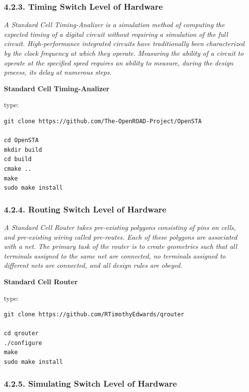 \documentclass[]{article}
\begin{document}
\subsubsection{4.2.3. Timing Switch Level of
Hardware}\label{timing-switch-level-of-hardware}

\emph{A Standard Cell Timing-Analizer is a simulation method of
computing the expected timing of a digital circuit without requiring a
simulation of the full circuit. High-performance integrated circuits
have traditionally been characterized by the clock frequency at which
they operate. Measuring the ability of a circuit to operate at the
specified speed requires an ability to measure, during the design
process, its delay at numerous steps.}

\textbf{Standard Cell Timing-Analizer}

type:

\begin{verbatim}
git clone https://github.com/The-OpenROAD-Project/OpenSTA

cd OpenSTA
mkdir build
cd build
cmake ..
make
sudo make install
\end{verbatim}

\subsubsection{4.2.4. Routing Switch Level of
Hardware}\label{routing-switch-level-of-hardware}

\emph{A Standard Cell Router takes pre-existing polygons consisting of
pins on cells, and pre-existing wiring called pre-routes. Each of these
polygons are associated with a net. The primary task of the router is to
create geometries such that all terminals assigned to the same net are
connected, no terminals assigned to different nets are connected, and
all design rules are obeyed.}

\textbf{Standard Cell Router}

type:

\begin{verbatim}
git clone https://github.com/RTimothyEdwards/qrouter

cd qrouter
./configure
make
sudo make install
\end{verbatim}

\subsubsection{4.2.5. Simulating Switch Level of
Hardware}\label{simulating-switch-level-of-hardware}
\end{document}
